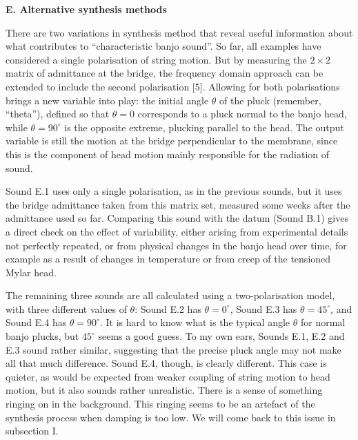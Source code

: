   \textbf{E. Alternative synthesis methods} 

  There are two variations in synthesis method that reveal useful information 
  about what contributes to ``characteristic banjo sound''. So far, all 
  examples have considered a single polarisation of string motion. But by 
  measuring the $2 \times 2$ matrix of admittance at the bridge, the frequency 
  domain approach can be extended to include the second polarisation [5]. 
  Allowing for both polarisations brings a new variable into play: the initial 
  angle $\theta$ of the pluck (remember, ``theta''), defined so that $\theta = 
  0$ corresponds to a pluck normal to the banjo head, while $\theta = 90^\circ$ 
  is the opposite extreme, plucking parallel to the head. The output variable 
  is still the motion at the bridge perpendicular to the membrane, since this 
  is the component of head motion mainly responsible for the radiation of 
  sound. 

  Sound E.1 uses only a single polarisation, as in the previous sounds, but it 
  uses the bridge admittance taken from this matrix set, measured some weeks 
  after the admittance used so far. Comparing this sound with the datum (Sound 
  B.1) gives a direct check on the effect of variability, either arising from 
  experimental details not perfectly repeated, or from physical changes in the 
  banjo head over time, for example as a result of changes in temperature or 
  from creep of the tensioned Mylar head. 


  The remaining three sounds are all calculated using a two-polarisation model, 
  with three different values of $\theta$: Sound E.2 has $\theta = 0^\circ$, 
  Sound E.3 has $\theta = 45^\circ$, and Sound E.4 has $\theta = 90^\circ$. It 
  is hard to know what is the typical angle $\theta$ for normal banjo plucks, 
  but $45^\circ$ seems a good guess. To my own ears, Sounds E.1, E.2 and E.3 
  sound rather similar, suggesting that the precise pluck angle may not make 
  all that much difference. Sound E.4, though, is clearly different. This case 
  is quieter, as would be expected from weaker coupling of string motion to 
  head motion, but it also sounds rather unrealistic. There is a sense of 
  something ringing on in the background. This ringing seems to be an artefact 
  of the synthesis process when damping is too low. We will come back to this 
  issue in subsection I. 


